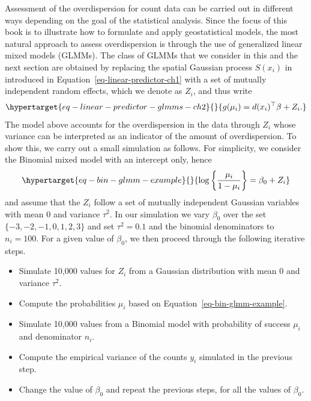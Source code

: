 \documentclass[
  letterpaper,
]{krantz}
\begin{document}
Assessment of the overdispersion for count data can be carried out in
different ways depending on the goal of the statistical analysis. Since
the focus of this book is to illustrate how to formulate and apply
geostatistical models, the most natural approach to assess
overdispersion is through the use of generalized linear mixed models
(GLMMs). The class of GLMMs that we consider in this and the next
section are obtained by replacing the spatial Gaussian process
\(S(x_i)\) in introduced in Equation~\ref{eq-linear-predictor-ch1} with
a set of mutually independent random effects, which we denote as
\(Z_i\), and thus write
\begin{equation}\protect\hypertarget{eq-linear-predictor-glmms-ch2}{}{
g(\mu_i) = d(x_i)^\top \beta + Z_i.
}\label{eq-linear-predictor-glmms-ch2}\end{equation} The model above
accounts for the overdispersion in the data through \(Z_i\) whose
variance can be interpreted as an indicator of the amount of
overdispersion. To show this, we carry out a small simulation as
follows. For simplicity, we consider the Binomial mixed model with an
intercept only, hence
\begin{equation}\protect\hypertarget{eq-bin-glmm-example}{}{
\log\left\{\frac{\mu_i}{1-\mu_i}\right\} = \beta_0 + Z_i
}\label{eq-bin-glmm-example}\end{equation} and assume that the \(Z_i\)
follow a set of mutually independent Gaussian variables with mean 0 and
variance \(\tau^2\). In our simulation we vary \(\beta_0\) over the set
\(\{-3, -2, -1, 0, 1, 2, 3\}\) and set \(\tau^2=0.1\) and the binomial
denominators to \(n_i = 100\). For a given value of \(\beta_0\), we then
proceed through the following iterative steps.

\begin{itemize}
\item
  Simulate 10,000 values for \(Z_i\) from a Gaussian distribution with
  mean 0 and variance \(\tau^2\).
\item
  Compute the probabilities \(\mu_i\) based on
  Equation~\ref{eq-bin-glmm-example}.
\item
  Simulate 10,000 values from a Binomial model with probability of
  success \(\mu_i\) and denominator \(n_i\).
\item
  Compute the empirical variance of the counts \(y_i\) simulated in the
  previous step.
\item
  Change the value of \(\beta_0\) and repeat the previous steps, for all
  the values of \(\beta_0\).
\end{itemize}
\end{document}
